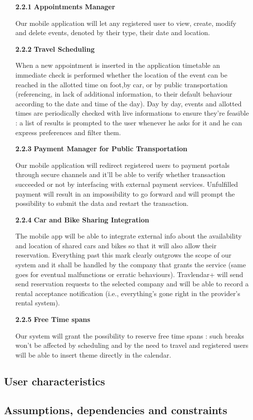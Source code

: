 		\begin{enumerate}

		\item
		[\textbf{2.2.1}] \textbf{Appointments Manager}
		
Our mobile application will let any registered user to view, create, modify and delete events, denoted by their type, their date and location. \\

		\item
		[\textbf{2.2.2}] \textbf{Travel Scheduling}

When a new appointment is inserted in the application timetable an immediate check is performed whether the location of the event can be reached in the allotted time on foot,by car, or by public transportation (referencing, in lack of additional information, to their default behaviour according to the date and time of the day).
Day by day, events and allotted times are periodically checked with live informations to ensure they’re feasible : a list of results is prompted to the user whenever he asks for it and he can express preferences and filter them.\\

		\item
		[\textbf{2.2.3}] \textbf{Payment Manager for Public Transportation}

Our mobile application will redirect registered users to payment portals through secure channels and it’ll be able to verify whether transaction succeeded or not by interfacing with external payment services.
Unfulfilled payment will result in an impossibility to go forward and will prompt the possibility to submit the data and restart the transaction.\\

		\item
		[\textbf{2.2.4}] \textbf{Car and Bike Sharing Integration}

The mobile app will be able to integrate external info about the availability and location of shared cars and bikes so that it will also allow their reservation.
Everything past this mark clearly outgrows the scope of our system and it shall be handled by the company that grants the service (same goes for eventual malfunctions or erratic behaviours). 
Travlendar+ will send send reservation requests to the selected company and will be able to record a rental acceptance notification (i.e., everything’s gone right in the provider’s rental system).\\


		\item
		[\textbf{2.2.5}] \textbf{Free Time spans}

Our system will grant the possibility to reserve free time spans : such breaks won’t be affected by scheduling and by the need to travel and registered users will be able to insert theme directly in the calendar.\\

		\end{enumerate}

			
		\subsection{User characteristics}
			
		\subsection{Assumptions, dependencies and constraints}
